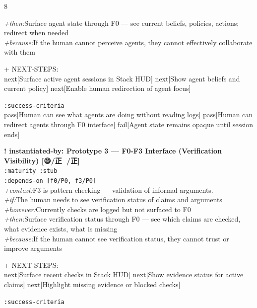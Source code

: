 \documentclass[landscape]{article}
\newcommand{\flexitag}[1]{\textcolor[gray]{0.35}{\textit{#1}}}
\newenvironment{devmapstub}{%
  \def\FrameCommand{\colorbox{devmapstubbg}}%
  \setlength{\fboxsep}{2pt}%
  \MakeFramed{\advance\hsize-\width \FrameRestore}%
}{\endMakeFramed}
\begin{document}
\begin{paracol}{8}
\begin{devmapstub}
  \flexitag{+then:}Surface agent state through F0 — see current beliefs, policies, actions; redirect when needed\\
  \flexitag{+because:}If the human cannot perceive agents, they cannot effectively collaborate with them\\
\par
  + NEXT-STEPS:\\
    next[Surface active agent sessions in Stack HUD] next[Show agent beliefs and current policy] next[Enable human redirection of agent focus]\\
\par
  \texttt{:\allowbreak{}success-\allowbreak{}criteria}\\
    pass[Human can see what agents are doing without reading logs] pass[Human can redirect agents through F0 interface] fail[Agent state remains opaque until session ends]\\
\par
\par
\end{devmapstub}
\begin{devmapstub}
\textbf{! instantiated-by: Prototype 3 — F0-F3 Interface (Verification Visibility) [😄/正 📁/正]}\\
  \texttt{:\allowbreak{}maturity :\allowbreak{}stub}\\
  \texttt{:\allowbreak{}depends-\allowbreak{}on [f0/\allowbreak{}P0,\allowbreak{} f3/\allowbreak{}P0]}\\
  \flexitag{+context:}F3 is pattern checking — validation of informal arguments.\\
  \flexitag{+if:}The human needs to see verification status of claims and arguments\\
  \flexitag{+however:}Currently checks are logged but not surfaced to F0\\
  \flexitag{+then:}Surface verification status through F0 — see which claims are checked, what evidence exists, what is missing\\
  \flexitag{+because:}If the human cannot see verification status, they cannot trust or improve arguments\\
\par
  + NEXT-STEPS:\\
    next[Surface recent checks in Stack HUD] next[Show evidence status for active claims] next[Highlight missing evidence or blocked checks]\\
\par
  \texttt{:\allowbreak{}success-\allowbreak{}criteria}\\

\end{devmapstub}
\end{paracol}
\end{document}
